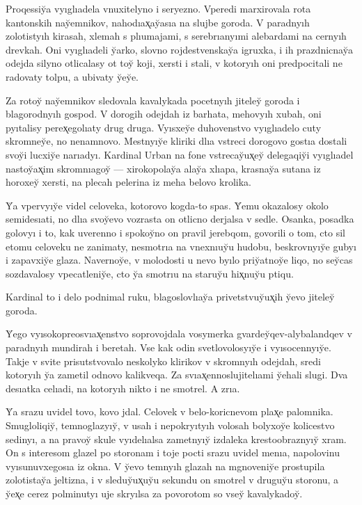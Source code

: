 \documentclass[10pt]{book}
\begin{document}
Proqessiy̆a vyıglıadela vnuxitelyno i seryezno. Vperedi marxirovala rota kantonskih nay̆emnikov, nahodıax̨ay̆asıa na slujbe goroda. V paradnyıh zolotistyıh kirasah, xlemah s plıumajami, s serebrıanyımi alebardami na cernyıh drevkah. Oni vyıglıadeli y̆arko, slovno rojdestvenskay̆a igruxka, i ih prazdnicnay̆a odejda silyno otlicalasy ot toy̆ koji, xersti i stali, v kotoryıh oni predpocitali ne radovaty tolpu, a ubivaty y̆ey̆e.

Za rotoy̆ nay̆emnikov sledovala kavalykada pocetnyıh jiteley̆ goroda i blagorodnyıh gospod. V dorogih odejdah iz barhata, mehovyıh xubah, oni pyıtalisy perex̨egolıaty drug druga. Vyısxey̆e duhovenstvo vyıglıadelo cuty skromney̆e, no nenamnovo. Mestnyıy̆e kliriki dlıa vstreci dorogovo gostıa dostali svoy̆i lucxiy̆e narıadyı. Kardinal Urban na fone vstrecay̆ux̨ey̆ delegaqiy̆i vyıglıadel nastoy̆ax̨im skromnıagoy̆ — xirokopolay̆a alay̆a xlıapa, krasnay̆a sutana iz horoxey̆ xersti, na plecah pelerina iz meha belovo krolika.

Y̆a vpervyıy̆e videl celoveka, kotorovo kogda-to spas. Y̆emu okazalosy okolo semidesıati, no dlıa svoy̆evo vozrasta on otlicno derjalsa v sedle. Osanka, posadka golovyı i to, kak uverenno i spokoy̆no on pravil jerebqom, govorili o tom, cto sil etomu celoveku ne zanimaty, nesmotrıa na vnexnıuy̆u hudobu, beskrovnyıy̆e gubyı i zapavxiy̆e glaza. Navernoy̆e, v molodosti u nevo byılo priy̆atnoy̆e liqo, no sey̆cas sozdavalosy vpecatleniy̆e, cto y̆a smotrıu na staruy̆u hix̨nuy̆u ptiqu.

Kardinal to i delo podnimal ruku, blagoslovlıay̆a privetstvuy̆ux̨ih y̆evo jiteley̆ goroda.

Y̆ego vyısokopreosvıax̨enstvo soprovojdala vosymerka gvardey̆qev-alybalandqev v paradnyıh mundirah i beretah. Vse kak odin svetlovolosyıy̆e i vyısocennyıy̆e. Takje v svite prisutstvovalo neskolyko klirikov v skromnyıh odejdah, sredi kotoryıh y̆a zametil odnovo kalikveqa. Za svıax̨ennoslujitelıami y̆ehali slugi. Dva desıatka celıadi, na kotoryıh nikto i ne smotrel. A zrıa.

Y̆a srazu uvidel tovo, kovo jdal. Celovek v belo-koricnevom plax̨e palomnika. Smugloliqiy̆, temnoglazyıy̆, v usah i nepokryıtyıh volosah bolyxoy̆e kolicestvo sedinyı, a na pravoy̆ skule vyıdelıalsa zametnyıy̆ izdaleka krestoobraznyıy̆ xram. On s interesom glazel po storonam i toje pocti srazu uvidel menıa, napolovinu vyısunuvxegosıa iz okna. V y̆evo temnyıh glazah na mgnoveniy̆e prostupila zolotistay̆a jeltizna, i v sleduy̆ux̨uy̆u sekundu on smotrel v druguy̆u storonu, a y̆ex̨e cerez polminutyı uje skryılsa za povorotom so vsey̆ kavalykadoy̆.
\end{document}
